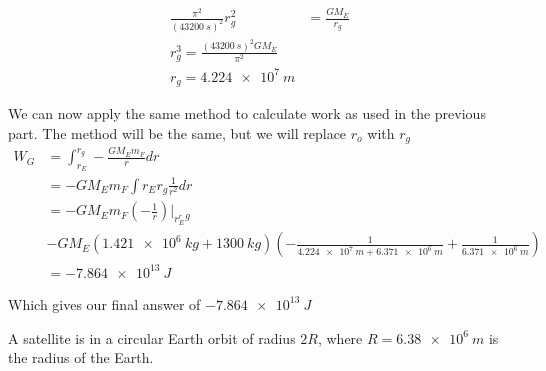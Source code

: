 \begin{solution}
\begin{parts}
		\begin{align*}
		\frac{\pi^2}{(\SI{43200}{s})^2}r_g^2&=\frac{GM_E}{r_g}\\
		r_g^3= \frac{(\SI{43200}{s})^2GM_E}{\pi^2}\\
		r_g= \SI{4.224e7}{m}
		\end{align*}
		
		We can now apply the same method to calculate work as used in the previous part. The method will be the same, but we will replace $r_o$ with $r_g$
		\begin{align*}
		W_G&= \int_{r_E}^{r_g}-\frac{GM_Em_F}{r}dr\\
		&=-GM_Em_F\int{r_E}{r_g}\frac{1}{r^2}dr\\
		&=-GM_Em_F(-\frac{1}{r})|_r_E^r_g\\
		&-GM_E(\SI{1.421e6}{kg}+\SI{1300}{kg})(-\frac{1}{\SI{4.224e7}{m}+\SI{6.371e6}{m}}+\frac{1}{\SI{6.371e6}{m}})\\
		&=\SI{-7.864e13}{J}
		\end{align*}
		
		Which gives our final answer of $\SI{-7.864e13}{J}$
	
	\end{parts}
\end{solution}



\question A satellite is in a circular Earth orbit of radius $2R$, where $R=\SI{6.38e6}{m}$ is the radius of the Earth.


